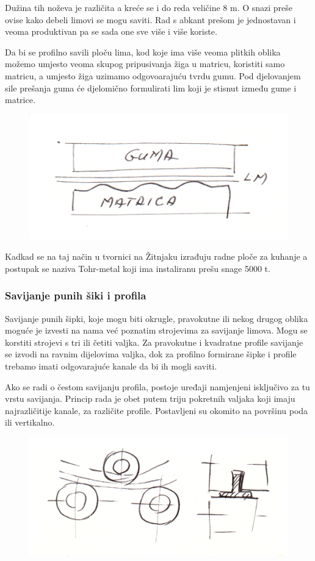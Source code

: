 \documentclass[a4paper,12pt]{article}
\numberwithin{figure}{section}
\begin{document}
\FloatBarrier
Dužina tih noževa je različita a kreće se i do reda veličine 8 m. O snazi preše ovise kako debeli limovi se mogu saviti. Rad s abkant prešom je jednostavan i veoma produktivan pa se sada one sve više i više koriste.\par
Da bi se profilno savili ploču lima, kod koje ima više veoma plitkih oblika možemo umjesto veoma skupog pripusivanja žiga u matricu, koristiti samo matricu, a umjesto žiga uzimamo odgovoarajuću tvrdu gumu. Pod djelovanjem sile prešanja guma će djelomično formulirati lim koji je stisnut između gume i matrice.
\begin{figure}[!h]
\centering
\includegraphics[scale=0.15]{image_49-2.png}
\end{figure}
\FloatBarrier
Kadkad se na taj način u tvornici na Žitnjaku izrađuju radne ploče za kuhanje a postupak se naziva Tohr-metal koji ima instaliranu prešu snage 5000 t.
\subsubsection{Savijanje punih šiki i profila}
Savijanje punih šipki, koje mogu biti okrugle, pravokutne ili nekog drugog oblika moguće je izvesti na nama već poznatim strojevima za savijanje limova. Mogu se korstiti strojevi s tri ili četiti valjka. Za pravokutne i kvadratne profile savijanje se izvodi na ravnim dijelovima valjka, dok za profilno formirane šipke i profile trebamo imati odgovarajuće kanale da bi ih mogli saviti.\par
Ako se radi o čestom savijanju profila, postoje uređaji namjenjeni isključivo za tu vrstu savijanja. Princip rada je obet putem triju pokretnih valjaka koji imaju najrazličitije kanale, za različite profile. Postavljeni su okomito na površinu poda ili vertikalno.
\begin{figure}[!h]
\centering
\includegraphics[scale=0.12]{image_49-3.png}
\end{figure}
\FloatBarrier
\end{document}
